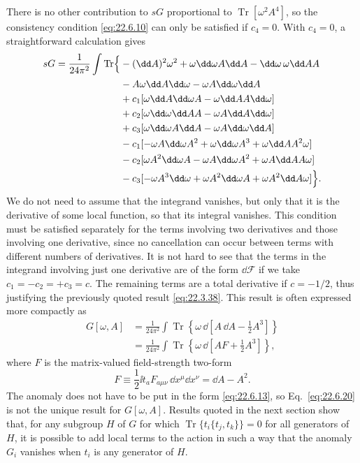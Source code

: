 There is no other contribution to $sG$ proportional to
$\operatorname{Tr}[\omega^2A^4]$, so the consistency condition
\eqref{eq:22.6.10} can only be satisfied if $c_4=0$. With $c_4=0$, a
straightforward calculation gives
\[
 \begin{aligned}
 sG=\frac{1}{24\pi^2}\int\operatorname{Tr}\Bigl\{
 &-(\dd A)^2\omega^2+\omega \dd\omega A \dd A-\dd\omega\,\omega \dd A A
 \\
 &-A\omega \dd A \dd\omega-\omega A \dd\omega \dd A
 \\
 &+c_1[\omega \dd A \dd\omega A-\omega \dd A A \dd\omega]
 \\
 &+c_2[\omega \dd\omega \dd A A-\omega A \dd A \dd\omega]
 \\
 &+c_3[\omega \dd\omega A \dd A-\omega A \dd\omega \dd A]
 \\
 &-c_1[-\omega A \dd\omega A^2+\omega \dd\omega A^3
       +\omega \dd A A^2\omega]
 \\
 &-c_2[\omega A^2\dd\omega A-\omega A \dd\omega A^2
       +\omega A \dd A A\omega]
 \\
 &-c_3[-\omega A^3\dd\omega+\omega A^2\dd\omega A
       +\omega A^2\dd A\omega]\Bigr\}.
 \end{aligned}
\]
We do not need to assume that the integrand vanishes, but only that it is
the derivative of some local function, so that its integral vanishes. This
condition must be satisfied separately for the terms involving two
derivatives and those involving one derivative, since no cancellation can
occur between terms with different numbers of derivatives. It is not hard
to see that the terms in the integrand involving just one derivative are
of the form $\dd\mathcal F$ if we take
$c_1=-c_2=+c_3=c$. The remaining terms are a total derivative if
$c=-1/2$, thus justifying the previously quoted result
\eqref{eq:22.3.38}. This result is often expressed more compactly as
\begin{equation}
 \begin{aligned}
 G[\omega,A]
 &=\frac{1}{24\pi^2}\int
 \operatorname{Tr}\left\{\omega\,\dd\left[
 A\,\dd A-\frac12A^3\right]\right\}
 \\
 &=\frac{1}{24\pi^2}\int
 \operatorname{Tr}\left\{\omega\,\dd\left[
 AF+\frac12A^3\right]\right\},
 \end{aligned}
 \tag{22.6.20}\label{eq:22.6.20}
\end{equation}
where $F$ is the matrix-valued field-strength two-form
\begin{equation}
 F\equiv\frac12 \ii t_a F_{a\mu\nu}\,\dd x^\mu \dd x^\nu
 =\dd A-A^2.
 \tag{22.6.21}\label{eq:22.6.21}
\end{equation}
The anomaly does not have to be put in the form \eqref{eq:22.6.13}, so
Eq.~\eqref{eq:22.6.20} is not the unique result for $G[\omega,A]$. Results
quoted in the next section show that, for any subgroup $H$ of $G$ for
which $\operatorname{Tr}\{t_i\{t_j,t_k\}\}=0$ for all generators of $H$,
it is possible to add local terms to the action in such a way that the
anomaly $G_i$ vanishes when $t_i$ is any generator of $H$.

